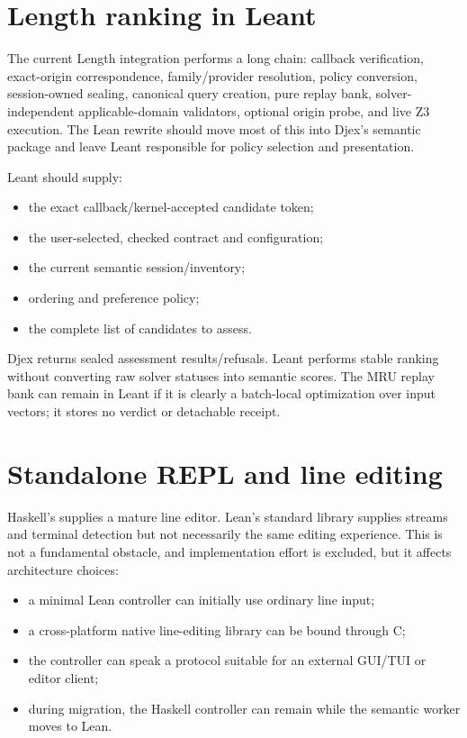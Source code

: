 \documentclass[10pt,letterpaper,oneside]{report}
\newcommand{\code}[1]{\texttt{\detokenize{#1}}}
\begin{document}
\section{Length ranking in Leant}

The current Length integration performs a long chain: callback verification, exact-origin correspondence, family/provider resolution, policy conversion, session-owned sealing, canonical query creation, pure replay bank, solver-independent applicable-domain validators, optional origin probe, and live Z3 execution. The Lean rewrite should move most of this into Djex's semantic package and leave Leant responsible for policy selection and presentation.

Leant should supply:

\begin{itemize}
  \item the exact callback/kernel-accepted candidate token;
  \item the user-selected, checked contract and configuration;
  \item the current semantic session/inventory;
  \item ordering and preference policy;
  \item the complete list of candidates to assess.
\end{itemize}

Djex returns sealed assessment results/refusals. Leant performs stable ranking without converting raw solver statuses into semantic scores. The MRU replay bank can remain in Leant if it is clearly a batch-local optimization over input vectors; it stores no verdict or detachable receipt.

\section{Standalone REPL and line editing}

Haskell's \code{haskeline} supplies a mature line editor. Lean's standard library supplies streams and terminal detection but not necessarily the same editing experience. This is not a fundamental obstacle, and implementation effort is excluded, but it affects architecture choices:

\begin{itemize}
  \item a minimal Lean controller can initially use ordinary line input;
  \item a cross-platform native line-editing library can be bound through C;
  \item the controller can speak a protocol suitable for an external GUI/TUI or editor client;
  \item during migration, the Haskell controller can remain while the semantic worker moves to Lean.
\end{itemize}
\end{document}
